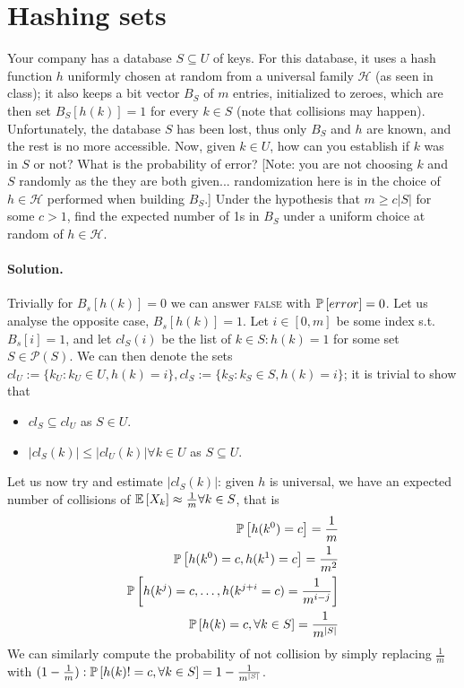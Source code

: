 \section{Hashing sets}

Your company has a database $S \subseteq U$ of keys. For this database, it uses a hash function $h$ uniformly chosen at random from a universal family $\mathcal{H}$ (as seen in class); it also keeps a bit vector $B_S$ of $m$ entries, initialized to zeroes, which are then set $B_S[h(k)] = 1$ for every $k \in S$ (note that collisions may happen). Unfortunately, the database $S$ has been lost, thus only $B_S$ and $h$ are known, and the rest is no more accessible. Now, given $k \in U$, how can you establish if $k$ was in $S$ or not? What is the probability of error? [Note: you are not choosing $k$ and $S$ randomly as the they are both given... randomization here is in the choice of $h \in \mathcal{H}$ performed when building $B_S$.] Under the hypothesis that $m \geq c|S|$ for some $c > 1$, find the expected number of 1s in $B_S$ under a uniform choice at random of $h \in \mathcal{H}$.

\vspace{0.5cm}
\paragraph{Solution.}
Trivially for $B_s[h(k)] = 0$ we can answer \textsc{false} with $\operatorname*{\mathbb{P}}\left[{error}\right] = 0$.
Let us analyse the opposite case, $B_s[h(k)] = 1$.
Let $i \in [0,m]$ be some index s.t. $B_s[i] = 1$, and let $cl_{S}(i)$ be the list of $k \in S: h(k) = 1$ for some set $S \in \displaystyle {\mathcal {P}}(S)$.
We can then denote the sets $cl_{U} := \{k_{U} : k_{U} \in U, h(k) = i\}, cl_{S} := \{k_{S} : k_{S} \in S, h(k) = i\}$; it is trivial to show that
    \begin{itemize}
    \label{6_cl_inclusion} \item $cl_{S} \subseteq cl_{U}$ as $S \in U$.
    \label{6_cl_length} \item $| cl_{S}(k) | \leq | cl_{U}(k) | \forall k \in U$ as $S \subseteq U$.
    \end{itemize}
Let us now try and estimate $|cl_{S}(k)|$: given $h$ is universal, we have an expected number of collisions of $\mathbb{E}\left[{X_{k}}\right] \approx \frac{1}{m} \forall k \in S$, that is
\begin{align*}
    \operatorname*{\mathbb{P}}\left[{h(k^{0}) = c}\right] = \frac{1}{m}                               \\
    \operatorname*{\mathbb{P}}\left[{h(k^{0}) = c, h(k^{1}) = c}\right] = \frac{1}{m^{2}}                           \\
    \operatorname*{\mathbb{P}}\left[{h(k^{j}) = c, \dots, h(k^{j + i} = c) = \frac{1}{m^{i - j}}}\right]    \\
    \operatorname*{\mathbb{P}}\left[{h(k) = c, \forall k \in S}\right] = \frac{1}{m^{|S|}}
\end{align*}
We can similarly compute the probability of not collision by simply replacing $\frac{1}{m}$ \\ with $(1 - \frac{1}{m}): \operatorname*{\mathbb{P}}\left[{h(k) != c, \forall k \in S}\right] = 1 - \frac{1}{m^{|S|}}$.

